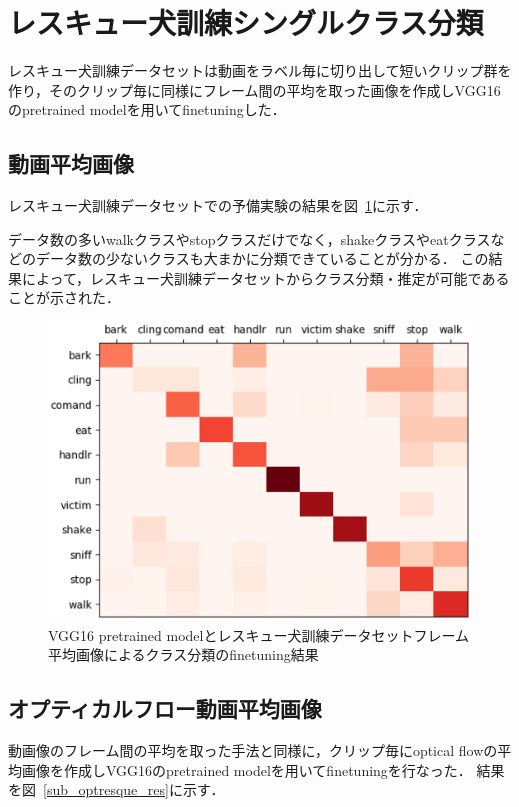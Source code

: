 \section{レスキュー犬訓練シングルクラス分類}
レスキュー犬訓練データセットは動画をラベル毎に切り出して短いクリップ群を作り，そのクリップ毎に同様にフレーム間の平均を取った画像を作成しVGG16のpretrained modelを用いてfinetuningした．
\subsection{動画平均画像}
レスキュー犬訓練データセットでの予備実験の結果を図~\ref{sub_resque_res}に示す．

データ数の多いwalkクラスやstopクラスだけでなく，shakeクラスやeatクラスなどのデータ数の少ないクラスも大まかに分類できていることが分かる．
この結果によって，レスキュー犬訓練データセットからクラス分類・推定が可能であることが示された．
\begin{figure}[H]
  \begin{center}
    \includegraphics[scale=0.7]{./Figures/resque_mean_result.eps}
    \caption{VGG16 pretrained modelとレスキュー犬訓練データセットフレーム平均画像によるクラス分類のfinetuning結果}
    \label{sub_resque_res}
  \end{center}
\end{figure}

\subsection{オプティカルフロー動画平均画像}
動画像のフレーム間の平均を取った手法と同様に，クリップ毎にoptical flowの平均画像を作成しVGG16のpretrained modelを用いてfinetuningを行なった．
結果を図~\ref{sub_optresque_res}に示す．

